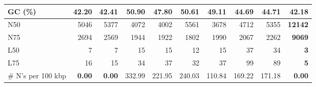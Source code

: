 \documentclass[12pt,a4paper]{article}
\begin{document}
\begin{table}[ht]
\begin{center}
\begin{tabular}{|l*{9}{|r}|}
GC (\%) & 42.20 & 42.41 & 50.90 & 47.80 & 50.61 & 49.11 & 44.69 & 44.71 & 42.18 \\ \hline
N50 & 5046 & 5377 & 4072 & 4002 & 5561 & 3678 & 4712 & 5355 & {\bf 12142} \\ \hline
N75 & 2694 & 2569 & 1944 & 1922 & 1802 & 1990 & 2067 & 2262 & {\bf 9069} \\ \hline
L50 & 7 & 7 & 15 & 15 & 12 & 15 & 37 & 34 & {\bf 3} \\ \hline
L75 & 16 & 15 & 34 & 37 & 32 & 37 & 99 & 89 & {\bf 5} \\ \hline
\# N's per 100 kbp & {\bf 0.00} & {\bf 0.00} & 332.99 & 221.95 & 240.03 & 110.84 & 169.22 & 171.18 & {\bf 0.00} \\ \hline
\end{tabular}
\end{center}
\end{table}
\end{document}
